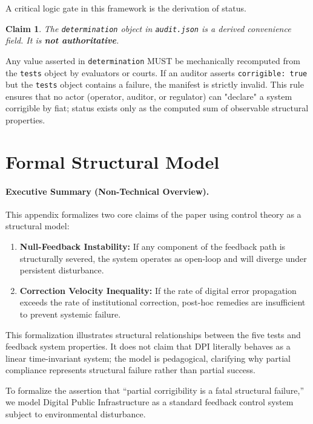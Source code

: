 \documentclass{article}
\newtheorem{claim}{Claim}
\begin{document}
A critical logic gate in this framework is the derivation of status.

\begin{claim}
The \texttt{determination} object in \texttt{audit.json} is a derived convenience field. It is \textbf{not authoritative}.
\end{claim}

Any value asserted in \texttt{determination} MUST be mechanically recomputed from the \texttt{tests} object by evaluators or courts. If an auditor asserts \texttt{corrigible: true} but the \texttt{tests} object contains a failure, the manifest is strictly invalid. This rule ensures that no actor (operator, auditor, or regulator) can "declare" a system corrigible by fiat; status exists only as the computed sum of observable structural properties.

\section{Formal Structural Model}
\label{appendix:proofs}

\paragraph{Executive Summary (Non-Technical Overview).}
This appendix formalizes two core claims of the paper using control theory as a structural model:
\begin{enumerate}[noitemsep]
    \item \textbf{Null-Feedback Instability:} If any component of the feedback path is structurally severed, the system operates as open-loop and will diverge under persistent disturbance.
    \item \textbf{Correction Velocity Inequality:} If the rate of digital error propagation exceeds the rate of institutional correction, post-hoc remedies are insufficient to prevent systemic failure.
\end{enumerate}
This formalization illustrates structural relationships between the five tests and feedback system properties. It does not claim that DPI literally behaves as a linear time-invariant system; the model is pedagogical, clarifying why partial compliance represents structural failure rather than partial success.

\medskip

To formalize the assertion that ``partial corrigibility is a fatal structural failure,'' we model Digital Public Infrastructure as a standard feedback control system subject to environmental disturbance.
\end{document}
